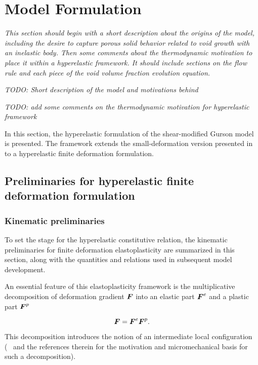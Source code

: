 \chapter{Model Formulation}
\label{model-form}

\textit{This section should begin with a short description about the
  origins of the model, including the desire to capture porous solid
  behavior related to void growth with an inelastic body. Then some
  comments about the thermodynamic motivation to place it within a
  hyperelastic framework. It should include sections on the flow rule
  and each piece of the void volume fraction evolution equation.}

\textit{TODO: Short description of the model and motivations behind}

\textit{TODO: add some comments on the thermodynamic motivation for hyperelastic framework}

In this section, the hyperelastic formulation of the shear-modified Gurson model is presented. The framework extends the small-deformation version presented in \cite{Nahshon2008, Nahshon2009} to a hyperelastic finite deformation formulation.

\section{Preliminaries for hyperelastic finite deformation formulation}

\subsection{Kinematic preliminaries}

To set the stage for the hyperelastic constitutive relation, the kinematic
preliminaries for finite deformation elastoplasticity are summarized
in this section, along with the quantities and relations used in
subsequent model development.

An essential feature of this elastoplasticity framework is the
multiplicative decomposition of deformation gradient ${\boldsymbol{F}}$ into an
elastic part ${\boldsymbol{F}}^e$ and a plastic part ${\boldsymbol{F}}^p$

\begin{equation}
  {\boldsymbol{F}} = {\boldsymbol{F}}^e{\boldsymbol{F}}^p.
\end{equation}

This decomposition introduces the notion of an intermediate local
configuration (\cf\ \cite{SimoHughes:98} and the references
therein for the motivation and micromechanical basis for such a
decomposition).

